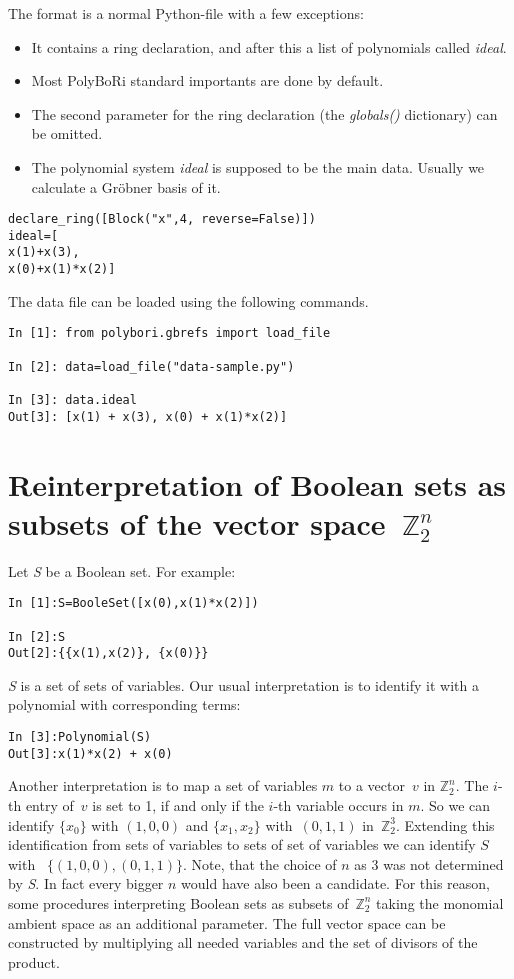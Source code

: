 \documentclass[]{article}
\newcommand{\set}[1]{\{#1\}}
\newcommand{\PolyBoRi}{{\sc PolyBoRi}\xspace}
\newcommand{\Groebner}{Gr\"{o}bner\xspace}
\newcommand{\functionname}[1]{\textit{#1}\xspace}
\newcommand{\pythonconstant}[1]{\textit{#1}\xspace}
\newcommand{\Ztwo}{\mathbb{Z}_2}
\begin{document}
The format is a normal Python-file with a few exceptions:
\begin{itemize}
    \item It contains a ring declaration, and after this a list of polynomials called \functionname{ideal}.
    \item Most \PolyBoRi standard importants are done by default.
    \item The second parameter for the ring declaration (the \functionname{globals()} dictionary) can be omitted.
    \item The polynomial system \functionname{ideal} is supposed to be the main data.
    Usually we calculate a \Groebner basis of it.
\end{itemize}
\begin{verbatim}
declare_ring([Block("x",4, reverse=False)])
ideal=[
x(1)+x(3),
x(0)+x(1)*x(2)]  
\end{verbatim}
%
The data file can be loaded using the following commands.
%
\begin{verbatim}
In [1]: from polybori.gbrefs import load_file

In [2]: data=load_file("data-sample.py")

In [3]: data.ideal
Out[3]: [x(1) + x(3), x(0) + x(1)*x(2)]
\end{verbatim}

\section{Reinterpretation of Boolean sets as subsets of the vector space~$\Ztwo^n$}
\label{reinterpretation-of-zdd}
Let \pythonconstant{S} be a Boolean set. For example:
\begin{verbatim}
In [1]:S=BooleSet([x(0),x(1)*x(2)])

In [2]:S
Out[2]:{{x(1),x(2)}, {x(0)}}
\end{verbatim}

\pythonconstant{S} is a set of sets of variables.
Our usual interpretation is to identify it with a polynomial with corresponding terms:
\begin{verbatim}
In [3]:Polynomial(S)
Out[3]:x(1)*x(2) + x(0)
\end{verbatim}
Another interpretation is to map a set of variables $m$ to a vector~$v$ in $\Ztwo^n$.
The $i$-th entry of~$v$ is set to 1, if and only if the $i$-th variable occurs in $m$.
So we can identify $\set{x_0}$ with $(1,0,0)$ and $\set{x_1,x_2}$ with~$(0,1,1)$ in~$\Ztwo^3$.
Extending this identification from sets of variables  to sets of set of variables we can identify $S$ with~%
$\set{(1,0,0), (0,1,1)}$.
Note, that the choice of $n$ as $3$ was not determined by \pythonconstant{S}. In fact every bigger $n$ would have also been a candidate.
For this reason, some procedures interpreting Boolean sets as subsets of~$\Ztwo^n$ taking the monomial ambient space as an additional parameter.
The full vector space can be constructed by multiplying all needed variables and the set of divisors of the product.
\end{document}
